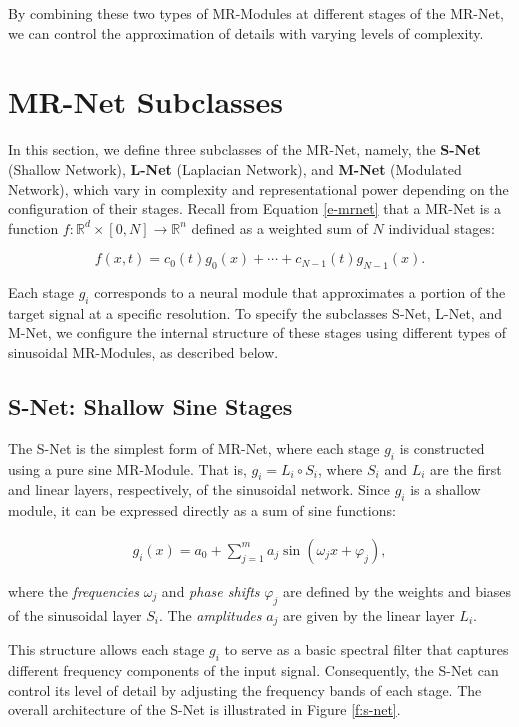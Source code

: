 By combining these two types of MR-Modules at different stages of the MR-Net, we can control the approximation of details with varying levels of complexity.


\section{MR-Net Subclasses}

In this section, we define three subclasses of the MR-Net, namely, the \textbf{S-Net} (Shallow Network), \textbf{L-Net} (Laplacian Network), and \textbf{M-Net} (Modulated Network), which vary in complexity and representational power depending on the configuration of their stages. Recall from Equation \ref{e-mrnet} that a MR-Net is a function \( f : \mathbb{R}^d \times [0, N] \to \mathbb{R}^n \) defined as a weighted sum of \( N \) individual stages:

\[
f(x, t) = c_0(t)g_0(x) + \cdots + c_{N-1}(t)g_{N-1}(x).
\]

Each stage \( g_i \) corresponds to a neural module that approximates a portion of the target signal at a specific resolution. To specify the subclasses S-Net, L-Net, and M-Net, we configure the internal structure of these stages using different types of sinusoidal MR-Modules, as described below.

\subsection{S-Net: Shallow Sine Stages}

The S-Net is the simplest form of MR-Net, where each stage \( g_i \) is constructed using a pure sine MR-Module. That is, \( g_i = L_i \circ S_i \), where \( S_i \) and \( L_i \) are the first and linear layers, respectively, of the sinusoidal network. Since \( g_i \) is a shallow module, it can be expressed directly as a sum of sine functions:

\begin{align}
    g_i(x) = a_0 + \sum_{j=1}^m a_j \sin\left(\omega_j x + \varphi_j\right),
\end{align}


where the \textit{frequencies} \( \omega_j \) and \textit{phase shifts} \( \varphi_j \) are defined by the weights and biases of the sinusoidal layer \( S_i \). The \textit{amplitudes} \( a_j \) are given by the linear layer \( L_i \).

This structure allows each stage \( g_i \) to serve as a basic spectral filter that captures different frequency components of the input signal. Consequently, the S-Net can control its level of detail by adjusting the frequency bands of each stage. The overall architecture of the S-Net is illustrated in Figure \ref{f:s-net}.


